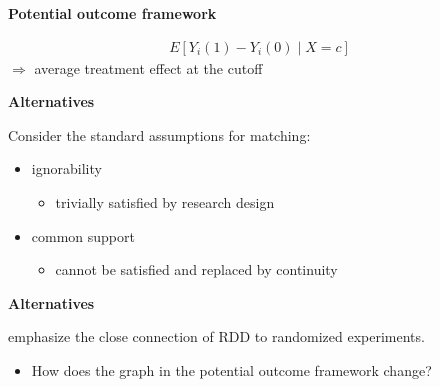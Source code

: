 \begin{frame}\textbf{Potential outcome framework}

\begin{align*}
E[Y_i(1) - Y_i(0) \mid X = c]
\end{align*}
$\Rightarrow$ average treatment effect at the cutoff

\end{frame}
\begin{frame}\textbf{Alternatives}\vspace{0.3cm}

Consider the standard assumptions for matching:\vspace{0.3cm}

\begin{itemize}\setlength\itemsep{1em}
\item ignorability\medskip
  \begin{itemize}
  \item trivially satisfied by research design
  \end{itemize}
\item common support\medskip
  \begin{itemize}
  \item cannot be satisfied and replaced by continuity
  \end{itemize}
\end{itemize}


\end{frame}
\begin{frame}\textbf{Alternatives}\vspace{0.3cm}

 emphasize the close connection of RDD to randomized experiments.\vspace{0.3cm}

\begin{itemize}
\item How does the graph in the potential outcome framework change?
\end{itemize}

\end{frame}
